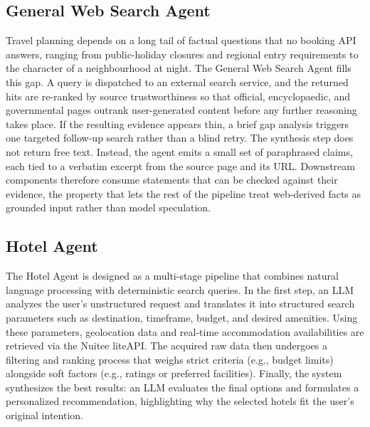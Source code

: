 \documentclass[a4paper,oneside,bibliography=totoc]{scrbook}
\begin{document}
\subsection{General Web Search Agent}
\label{sec:system:search:web}
Travel planning depends on a long tail of factual questions that no booking API answers, ranging from public-holiday closures and regional entry requirements to the character of a neighbourhood at night. The General Web Search Agent fills this gap. A query is dispatched to an external search service, and the returned hits are re-ranked by source trustworthiness so that official, encyclopaedic, and governmental pages outrank user-generated content before any further reasoning takes place. If the resulting evidence appears thin, a brief gap analysis triggers one targeted follow-up search rather than a blind retry. The synthesis step does not return free text. Instead, the agent emits a small set of paraphrased claims, each tied to a verbatim excerpt from the source page and its URL. Downstream components therefore consume statements that can be checked against their evidence, the property that lets the rest of the pipeline treat web-derived facts as grounded input rather than model speculation.


\subsection{Hotel Agent}
\label{sec:system:search:domain}
The Hotel Agent is designed as a multi-stage pipeline that combines natural language processing with deterministic search queries. In the first step, an LLM analyzes the user's unstructured request and translates it into structured search parameters such as destination, timeframe, budget, and desired amenities. Using these parameters, geolocation data and real-time accommodation availabilities are retrieved via the Nuitee liteAPI. The acquired raw data then undergoes a filtering and ranking process that weighs strict criteria (e.g., budget limits) alongside soft factors (e.g., ratings or preferred facilities). Finally, the system synthesizes the best results: an LLM evaluates the final options and formulates a personalized recommendation, highlighting why the selected hotels fit the user's original intention.
\end{document}
